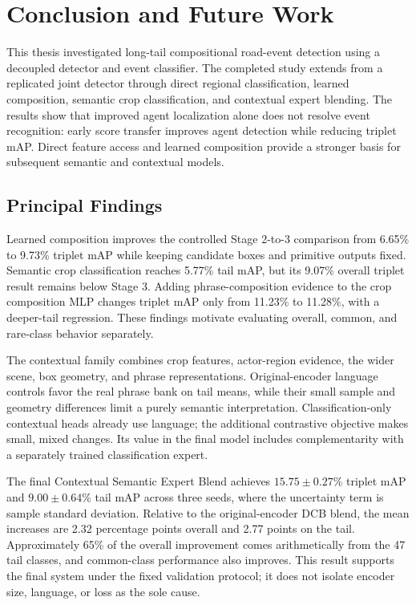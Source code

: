 \chapter{Conclusion and Future Work}

This thesis investigated long-tail compositional road-event detection using a decoupled detector and event classifier. The completed study extends from a replicated joint detector through direct regional classification, learned composition, semantic crop classification, and contextual expert blending. The results show that improved agent localization alone does not resolve event recognition: early score transfer improves agent detection while reducing triplet mAP. Direct feature access and learned composition provide a stronger basis for subsequent semantic and contextual models.

\section{Principal Findings}

Learned composition improves the controlled Stage 2-to-3 comparison from 6.65\% to 9.73\% triplet mAP while keeping candidate boxes and primitive outputs fixed. Semantic crop classification reaches 5.77\% tail mAP, but its 9.07\% overall triplet result remains below Stage 3. Adding phrase-composition evidence to the crop composition MLP changes triplet mAP only from 11.23\% to 11.28\%, with a deeper-tail regression. These findings motivate evaluating overall, common, and rare-class behavior separately.

The contextual family combines crop features, actor-region evidence, the wider scene, box geometry, and phrase representations. Original-encoder language controls favor the real phrase bank on tail means, while their small sample and geometry differences limit a purely semantic interpretation. Classification-only contextual heads already use language; the additional contrastive objective makes small, mixed changes. Its value in the final model includes complementarity with a separately trained classification expert.

The final Contextual Semantic Expert Blend achieves \(15.75\pm0.27\)\% triplet mAP and \(9.00\pm0.64\)\% tail mAP across three seeds, where the uncertainty term is sample standard deviation. Relative to the original-encoder DCB blend, the mean increases are 2.32 percentage points overall and 2.77 points on the tail. Approximately 65\% of the overall improvement comes arithmetically from the 47 tail classes, and common-class performance also improves. This result supports the final system under the fixed validation protocol; it does not isolate encoder size, language, or loss as the sole cause.

